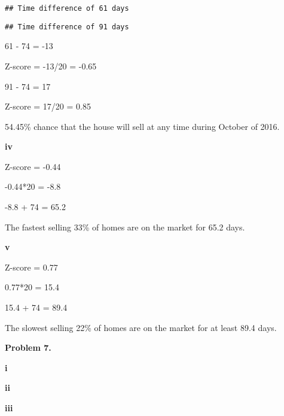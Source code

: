 \documentclass[
]{article}
\newenvironment{Shaded}{\begin{snugshade}}{\end{snugshade}}
\newcommand{\KeywordTok}[1]{\textcolor[rgb]{0.13,0.29,0.53}{\textbf{#1}}}
\newcommand{\NormalTok}[1]{#1}
\newcommand{\OperatorTok}[1]{\textcolor[rgb]{0.81,0.36,0.00}{\textbf{#1}}}
\newcommand{\StringTok}[1]{\textcolor[rgb]{0.31,0.60,0.02}{#1}}
\begin{document}
\begin{verbatim}
## Time difference of 61 days
\end{verbatim}

\begin{Shaded}
\end{Shaded}

\begin{verbatim}
## Time difference of 91 days
\end{verbatim}

61 - 74 = -13

Z-score = -13/20 = -0.65

91 - 74 = 17

Z-score = 17/20 = 0.85

54.45\% chance that the house will sell at any time during October of
2016.

\textbf{iv}

Z-score = -0.44

-0.44*20 = -8.8

-8.8 + 74 = 65.2

The fastest selling 33\% of homes are on the market for 65.2 days.

\textbf{v}

Z-score = 0.77

0.77*20 = 15.4

15.4 + 74 = 89.4

The slowest selling 22\% of homes are on the market for at least 89.4
days.

\textbf{Problem 7.}

\textbf{i}

\textbf{ii}

\textbf{iii}
\end{document}
